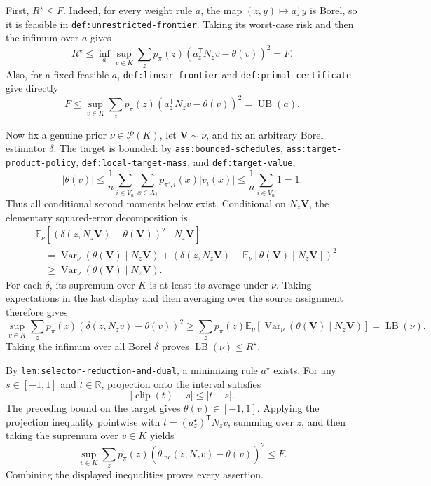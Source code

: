 First, \(R^{\star}\le F\).  Indeed, for every weight rule \(a\), the map \((z,y)\mapsto a_z^{\mathsf T}y\) is Borel, so it is feasible in \texttt{def:unrestricted-frontier}.  Taking its worst-case risk and then the infimum over \(a\) gives
\[
 R^{\star}\le
 \inf_a\sup_{v\in K}\sum_zp_{\pi}(z)
 (a_z^{\mathsf T}N_zv-\theta(v))^2=F.
\]
Also, for a fixed feasible \(a\), \texttt{def:linear-frontier} and \texttt{def:primal-certificate} give directly
\[
 F\le \sup_{v\in K}\sum_zp_{\pi}(z)
 (a_z^{\mathsf T}N_zv-\theta(v))^2=\operatorname{UB}(a).
\]

Now fix a genuine prior \(\nu\in\mathcal P(K)\), let \(\mathbf V\sim\nu\), and fix an arbitrary Borel estimator \(\delta\).  The target is bounded: by \texttt{ass:bounded-schedules}, \texttt{ass:target-product-policy}, \texttt{def:local-target-mass}, and \texttt{def:target-value},
\[
 |\theta(v)|
 \le \frac1n\sum_{i\in V_n}\sum_{x\in X_i}
 p_{\pi',i}(x)|v_i(x)|
 \le \frac1n\sum_{i\in V_n}1=1.
\]
Thus all conditional second moments below exist.  Conditional on \(N_z\mathbf V\), the elementary squared-error decomposition is
\[
\begin{aligned}
 &\mathbb E_{\nu}\!\left[
   (\delta(z,N_z\mathbf V)-\theta(\mathbf V))^2
   \mid N_z\mathbf V\right]\\
 &\quad=\operatorname{Var}_{\nu}(\theta(\mathbf V)\mid N_z\mathbf V)
 +\left(\delta(z,N_z\mathbf V)
 -\mathbb E_{\nu}[\theta(\mathbf V)\mid N_z\mathbf V]\right)^2\\
 &\quad\ge \operatorname{Var}_{\nu}(\theta(\mathbf V)\mid N_z\mathbf V).
\end{aligned}
\]
For each \(\delta\), its supremum over \(K\) is at least its average under \(\nu\).  Taking expectations in the last display and then averaging over the source assignment therefore gives
\[
 \sup_{v\in K}\sum_zp_{\pi}(z)
 (\delta(z,N_zv)-\theta(v))^2
 \ge \sum_zp_{\pi}(z)\mathbb E_{\nu}
 [\operatorname{Var}_{\nu}(\theta(\mathbf V)\mid N_z\mathbf V)]
 =\operatorname{LB}(\nu).
\]
Taking the infimum over all Borel \(\delta\) proves \(\operatorname{LB}(\nu)\le R^{\star}\).

By \texttt{lem:selector-reduction-and-dual}, a minimizing rule \(a^{\star}\) exists.  For any \(s\in[-1,1]\) and \(t\in\mathbb R\), projection onto the interval satisfies
\[
 |\operatorname{clip}(t)-s|\le |t-s|.
\]
The preceding bound on the target gives \(\theta(v)\in[-1,1]\).  Applying the projection inequality pointwise with \(t=(a_z^{\star})^{\mathsf T}N_zv\), summing over \(z\), and then taking the supremum over \(v\in K\) yields
\[
 \sup_{v\in K}\sum_zp_{\pi}(z)
 (\widehat\theta_{\mathrm{inc}}(z,N_zv)-\theta(v))^2
 \le F.
\]
Combining the displayed inequalities proves every assertion.